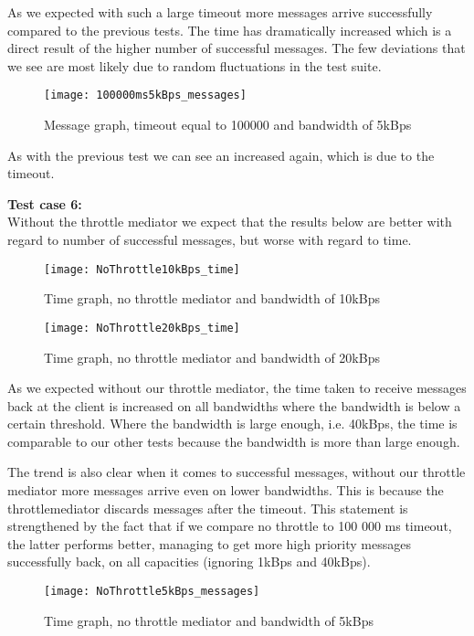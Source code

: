 	As we expected with such a large timeout more messages arrive successfully compared to the previous tests. The time has dramatically increased which is a direct result of the higher number of successful messages. The few deviations that we see are most likely due to random fluctuations in the test suite. 
	
	\begin{figure}[H]
		\centering
		\texttt{[image: 100000ms5kBps\_messages]}
		\caption{Message graph, timeout equal to 100000 and bandwidth of 5kBps} 
		\label{figure:results:100000ms5kBps_messages}
	\end{figure}
	As with the previous test we can see an increased again, which is due to the timeout.
    
    \textbf{Test case 6:}\\
    Without the throttle mediator we expect that the results below are better with regard to number of successful messages, but worse with regard to time.
    \begin{figure}[H]
		\centering
		\texttt{[image: NoThrottle10kBps\_time]}
		\caption{Time graph, no throttle mediator and bandwidth of 10kBps} 
		\label{figure:results:NoThrottle10kBps_time}
	\end{figure}
	
	\begin{figure}[H]
		\centering
		\texttt{[image: NoThrottle20kBps\_time]}
		\caption{Time graph, no throttle mediator and bandwidth of 20kBps} 
		\label{figure:results:NoThrottle20kBps_time}
	\end{figure}
	
	As we expected without our throttle mediator, the time taken to receive messages back at the client is increased on all bandwidths where the bandwidth is below a certain threshold. Where the bandwidth is large enough, i.e. 40kBps, the time is comparable to our other tests because the bandwidth is more than large enough.
	
	The trend is also clear when it comes to successful messages, without our throttle mediator more messages arrive even on lower bandwidths. This is because the throttlemediator discards messages after the timeout. This statement is strengthened by the fact that if we compare no throttle to 100 000 ms timeout, the latter performs better, managing to get more high priority messages successfully back, on all capacities (ignoring 1kBps and 40kBps).
	
	\begin{figure}[H]
		\centering
		\texttt{[image: NoThrottle5kBps\_messages]}
		\caption{Time graph, no throttle mediator and bandwidth of 5kBps} 
		\label{figure:results:NoThrottle5kBps_messages}
	\end{figure}\\

